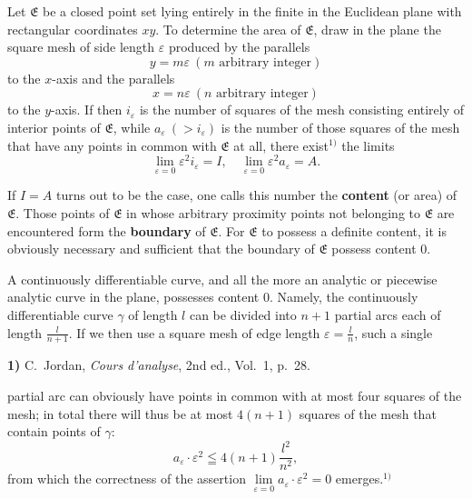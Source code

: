 \documentclass{article}
\begin{document}
Let $\mathfrak{E}$ be a closed point set lying entirely in the finite in the Euclidean plane with rectangular coordinates $xy$. To determine the area of $\mathfrak{E}$, draw in the plane the square mesh of side length $\varepsilon$ produced by the parallels
\[ y = m\varepsilon \ (m \text{ arbitrary integer}) \]
to the $x$-axis and the parallels
\[ x = n\varepsilon \ (n \text{ arbitrary integer}) \]
to the $y$-axis. If then $i_\varepsilon$ is the number of squares of the mesh consisting entirely of interior points of $\mathfrak{E}$, while $a_\varepsilon\ (> i_\varepsilon)$ is the number of those squares of the mesh that have any points in common with $\mathfrak{E}$ at all, there exist${}^{1)}$ the limits
\[ \lim_{\varepsilon=0} \varepsilon^2 i_\varepsilon = I, \quad \lim_{\varepsilon=0} \varepsilon^2 a_\varepsilon = A. \]

If $I = A$ turns out to be the case, one calls this number the \textbf{content} (or area) of $\mathfrak{E}$. Those points of $\mathfrak{E}$ in whose arbitrary proximity points not belonging to $\mathfrak{E}$ are encountered form the \textbf{boundary} of $\mathfrak{E}$. For $\mathfrak{E}$ to possess a definite content, it is obviously necessary and sufficient that the boundary of $\mathfrak{E}$ possess content $0$.

A continuously differentiable curve, and all the more an analytic or piecewise analytic curve in the plane, possesses content $0$. Namely, the continuously differentiable curve $\gamma$ of length $l$ can be divided into $n + 1$ partial arcs each of length $\frac{l}{n + 1}$. If we then use a square mesh of edge length $\varepsilon = \frac{l}{n}$, such a single

\textbf{1)} C.~Jordan, \emph{Cours d'analyse}, 2nd ed., Vol.~1, p.~28.

partial arc can obviously have points in common with at most four squares of the mesh; in total there will thus be at most $4(n + 1)$ squares of the mesh that contain points of $\gamma$:
\[ a_\varepsilon \cdot \varepsilon^2 \leqq 4(n + 1) \frac{l^2}{n^2}, \]
from which the correctness of the assertion $\lim\limits_{\varepsilon=0} a_\varepsilon \cdot \varepsilon^2 = 0$ emerges.${}^{1)}$
\end{document}

